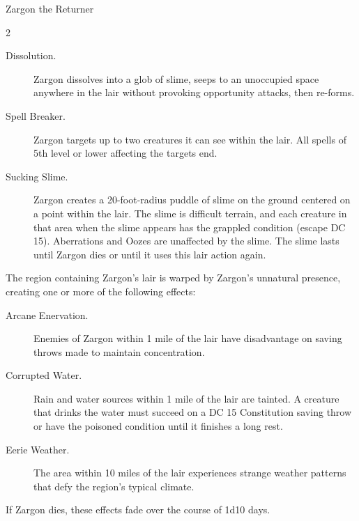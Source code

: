 \documentclass[10pt,a4paper,twoside,bg=print,twocolumn,openany,nodeprecatedcode]{dndbook}
\begin{document}
\begin{DndMonster}[float*=b,width=\textwidth + 8pt]{Zargon the Returner}
\begin{multicols}{2}
\begin{description}
\item[Dissolution.]
Zargon dissolves into a glob of slime, seeps to an unoccupied space anywhere in the lair without provoking opportunity attacks, then re-forms.
\item[Spell Breaker.]
Zargon targets up to two creatures it can see within the lair. All spells of 5th level or lower affecting the targets end.
\item[Sucking Slime.]
Zargon creates a 20-foot-radius puddle of slime on the ground centered on a point within the lair. The slime is difficult terrain, and each creature in that area when the slime appears has the grappled condition (escape DC 15). Aberrations and Oozes are unaffected by the slime. The slime lasts until Zargon dies or until it uses this lair action again.
\end{description}

The region containing Zargon's lair is warped by Zargon's unnatural presence, creating one or more of the following effects:


\begin{description}
\item[Arcane Enervation.]
Enemies of Zargon within 1 mile of the lair have disadvantage on saving throws made to maintain concentration.
\item[Corrupted Water.]
Rain and water sources within 1 mile of the lair are tainted. A creature that drinks the water must succeed on a DC 15 Constitution saving throw or have the poisoned condition until it finishes a long rest.
\item[Eerie Weather.]
The area within 10 miles of the lair experiences strange weather patterns that defy the region's typical climate.
\end{description}

If Zargon dies, these effects fade over the course of 1d10 days.

\end{multicols}
\end{DndMonster}
\end{document}
